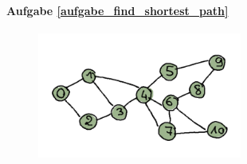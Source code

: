 \paragraph{Aufgabe \ref{aufgabe_find_shortest_path}}
\begin{figure}[H]
    \centering
    \includegraphics[width=0.6\textwidth]{Pictures/SP/shortest_path_graph.png}
\end{figure}

